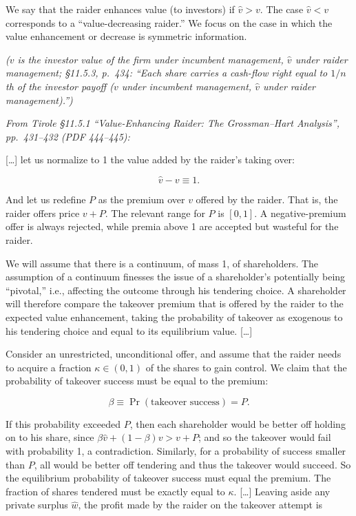 \documentclass[11pt,a4paper]{article}
\begin{document}
We say that the raider enhances value (to investors) if \(\hat v > v\). The case \(\hat v < v\)
corresponds to a ``value-decreasing raider.'' We focus on the case in which the value enhancement or
decrease is symmetric information.

\emph{(\(v\) is the investor value of the firm under incumbent management, \(\hat v\) under raider
management; §11.5.3, p.~434: ``Each share carries a cash-flow right equal to \(1/n\)th of the
investor payoff (\(v\) under incumbent management, \(\hat v\) under raider management).'')}

\emph{From Tirole §11.5.1 ``Value-Enhancing Raider: The Grossman--Hart Analysis'', pp.~431--432 (PDF
444--445):}

{[}\ldots{]} let us normalize to 1 the value added by the raider's taking over:

\[\hat v - v \equiv 1.\]

And let us redefine \(P\) as the premium over \(v\) offered by the raider. That is, the raider
offers price \(v + P\). The relevant range for \(P\) is \([0, 1]\). A negative-premium offer is
always rejected, while premia above 1 are accepted but wasteful for the raider.

We will assume that there is a continuum, of mass 1, of shareholders. The assumption of a continuum
finesses the issue of a shareholder's potentially being ``pivotal,'' i.e., affecting the outcome
through his tendering choice. A shareholder will therefore compare the takeover premium that is
offered by the raider to the expected value enhancement, taking the probability of takeover as
exogenous to his tendering choice and equal to its equilibrium value. {[}\ldots{]}

Consider an unrestricted, unconditional offer, and assume that the raider needs to acquire a
fraction \(\kappa \in (0, 1)\) of the shares to gain control. We claim that the probability of
takeover success must be equal to the premium:

\[\beta \equiv \Pr(\text{takeover success}) = P.\]

If this probability exceeded \(P\), then each shareholder would be better off holding on to his
share, since \(\beta\hat v + (1 - \beta)v > v + P\); and so the takeover would fail with probability
1, a contradiction. Similarly, for a probability of success smaller than \(P\), all would be better
off tendering and thus the takeover would succeed. So the equilibrium probability of takeover
success must equal the premium. The fraction of shares tendered must be exactly equal to \(\kappa\).
{[}\ldots{]} Leaving aside any private surplus \(\hat w\), the profit made by the raider on the
takeover attempt is
\end{document}
